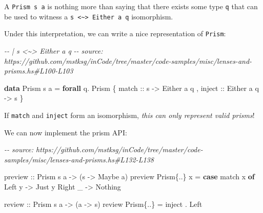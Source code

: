 \documentclass[]{article}
\newenvironment{Shaded}{}{}
\newcommand{\CommentTok}[1]{\textcolor[rgb]{0.38,0.63,0.69}{\textit{#1}}}
\newcommand{\DataTypeTok}[1]{\textcolor[rgb]{0.56,0.13,0.00}{#1}}
\newcommand{\KeywordTok}[1]{\textcolor[rgb]{0.00,0.44,0.13}{\textbf{#1}}}
\newcommand{\NormalTok}[1]{#1}
\newcommand{\OperatorTok}[1]{\textcolor[rgb]{0.40,0.40,0.40}{#1}}
\newcommand{\OtherTok}[1]{\textcolor[rgb]{0.00,0.44,0.13}{#1}}
\begin{document}
A \texttt{Prism\textquotesingle{}\ s\ a} is nothing more than saying that there
exists some type \texttt{q} that can be used to witness a
\texttt{s\ \textless{}\textasciitilde{}\textgreater{}\ Either\ a\ q}
isomorphism.

Under this interpretation, we can write a nice representation of
\texttt{Prism\textquotesingle{}}:

\begin{Shaded}
\begin{Highlighting}[]
\CommentTok{{-}{-} | s \textless{}\textasciitilde{}\textgreater{} Either a q}
\CommentTok{{-}{-} source: https://github.com/mstksg/inCode/tree/master/code{-}samples/misc/lenses{-}and{-}prisms.hs\#L100{-}L103}

\KeywordTok{data} \DataTypeTok{Prism\textquotesingle{}}\NormalTok{ s a }\OtherTok{=} \KeywordTok{forall}\NormalTok{ q}\OperatorTok{.} \DataTypeTok{Prism\textquotesingle{}}
\NormalTok{    \{}\OtherTok{ match  ::}\NormalTok{ s }\OtherTok{{-}\textgreater{}} \DataTypeTok{Either}\NormalTok{ a q}
\NormalTok{    ,}\OtherTok{ inject ::} \DataTypeTok{Either}\NormalTok{ a q }\OtherTok{{-}\textgreater{}}\NormalTok{ s}
\NormalTok{    \}}
\end{Highlighting}
\end{Shaded}

If \texttt{match} and \texttt{inject} form an isomorphism, \emph{this can only
represent valid prisms}!

We can now implement the prism API:

\begin{Shaded}
\begin{Highlighting}[]
\CommentTok{{-}{-} source: https://github.com/mstksg/inCode/tree/master/code{-}samples/misc/lenses{-}and{-}prisms.hs\#L132{-}L138}

\OtherTok{preview ::} \DataTypeTok{Prism\textquotesingle{}}\NormalTok{ s a }\OtherTok{{-}\textgreater{}}\NormalTok{ (s }\OtherTok{{-}\textgreater{}} \DataTypeTok{Maybe}\NormalTok{ a)}
\NormalTok{preview }\DataTypeTok{Prism\textquotesingle{}}\NormalTok{\{}\OperatorTok{..}\NormalTok{\} x }\OtherTok{=} \KeywordTok{case}\NormalTok{ match x }\KeywordTok{of}
    \DataTypeTok{Left}\NormalTok{  y }\OtherTok{{-}\textgreater{}} \DataTypeTok{Just}\NormalTok{ y}
    \DataTypeTok{Right}\NormalTok{ \_ }\OtherTok{{-}\textgreater{}} \DataTypeTok{Nothing}

\OtherTok{review  ::} \DataTypeTok{Prism\textquotesingle{}}\NormalTok{ s a }\OtherTok{{-}\textgreater{}}\NormalTok{ (a }\OtherTok{{-}\textgreater{}}\NormalTok{ s)}
\NormalTok{review }\DataTypeTok{Prism\textquotesingle{}}\NormalTok{\{}\OperatorTok{..}\NormalTok{\} }\OtherTok{=}\NormalTok{ inject }\OperatorTok{.} \DataTypeTok{Left}
\end{Highlighting}
\end{Shaded}
\end{document}
